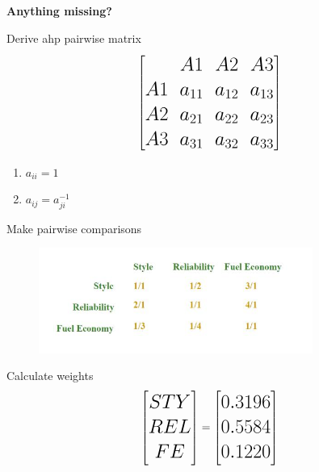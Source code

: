 \documentclass[aspectratio=1610,pdftex,dvipsnames,compress,xcolor={dvipsnames}]{beamer}
\newcommand{\acs}{\acrshort} %
\begin{document}
\begin{frame}[plain]{}
    \centering\LARGE\textbf{Anything missing?}
\end{frame}


\addtocounter{framenumber}{-1}
\begin{frame}{Derive \acs{ahp} pairwise matrix}
    \begin{equation}
        \LARGE
        \begin{bmatrix}
               &A1 &A2 &A3 \\ 
            A1 &a_{11} &a_{12} &a_{13} \\ 
            A2 &a_{21} &a_{22} &a_{23} \\ 
            A3 &a_{31} &a_{32} &a_{33}
        \end{bmatrix} 
    \end{equation}

    \begin{enumerate}[series=outerlist,topsep=0pt,itemsep=5pt,leftmargin=*,label=(\arabic*)]
        \item[]$a_{ii}=1$
        \item[]$a_{ij}=a^{-1}_{ji}$
    \end{enumerate}
\end{frame}


\begin{frame}{Make pairwise comparisons}
    \begin{figure}
        \centering
        \includegraphics[width=0.80\textwidth]{ahp_car.criteria.jpg}
    \end{figure}
\end{frame}


\begin{frame}{Calculate weights}
    \begin{equation}
        \LARGE
        \begin{bmatrix} STY \\ REL \\ FE \end{bmatrix} = \begin{bmatrix} 0.3196 \\ 0.5584 \\ 0.1220 \end{bmatrix}
    \end{equation}
\end{frame}
\end{document}
